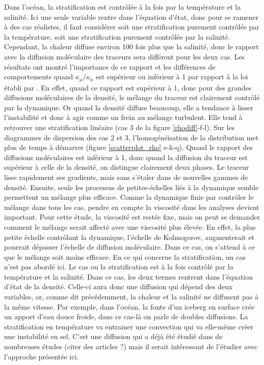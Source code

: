 \documentclass[a4paper,12pt]{article}
\begin{document}
    Dans l'océan, la stratification est contrôlée à la fois par la température et la salinité. Ici une seule variable rentre dans l'équation d'état, donc pour se ramener à des cas réalistes, il faut considérer soit une stratification purement contrôlée par la température, soit une stratification purement contrôlée par la salinité. Cependant, la chaleur diffuse environ 100 fois plus que la salinité, donc le rapport avec la diffusion moléculaire des traceurs sera différent pour les deux cas. Les résultats ont montré l'importance de ce rapport et les différences de comportements quand $\kappa_{\rho}/\kappa_{\phi}$ est supérieur ou inférieur à 1 par rapport à la loi établi par \cite{penney_diapycnal_2020}. En effet, quand ce rapport est supérieur à 1, donc pour des grandes diffusions moléculaires de la densité, le mélange du traceur est clairement contrôlé par la dynamique. Or quand la densité diffuse beaucoup, elle a tendance à lisser l'instabilité et donc à agir comme un frein au mélange turbulent. Elle tend à retrouver une stratification linéaire (cas 3 de la figure \ref{rhodiff}-f-l). Sur les diagrammes de dispersion des cas 2 et 3, l'homogénéisation de la distribution met plus de temps à démarrer (figure \ref{scatterplot_rho} e-k-q). Quand le rapport des diffusions moléculaires est inférieur à 1, donc quand la diffusion du traceur est supérieur à celle de la densité, on distingue clairement deux phases. Le traceur lisse rapidement ses gradients, mais sans s'étaler dans de nouvelles gammes de densité. Ensuite, seule les processus de petites-échelles liés à la dynamique semble permettent un mélange plus efficace. Comme la dynamique finie par contrôler le mélange dans tous les cas, pendre en compte la viscosité dans les analyses devient important. Pour cette étude, la viscosité est restée fixe, mais on peut se demander comment le mélange serait affecté avec une viscosité plus élevée. En effet, la plus petite échelle contrôlant la dynamique, l'échelle de Kolmogorov, augmenterait et pourrait dépasser l'échelle de diffusion moléculaire. Dans ce cas, on s'attend à ce que le mélange soit moins efficace. En ce qui concerne la stratification, un cas n'est pas abordé ici. Le cas ou la stratification est à la fois contrôlé par la température et la salinité. Dans ce cas, les deux termes rentrent dans l'équation d'état de la densité. Celle-ci aura donc une diffusion qui dépend des deux variables, or, comme dit précédemment, la chaleur et la salinité ne diffusent pas à la même vitesse. Par exemple, dans l'océan, la fonte d'un iceberg en surface crée un apport d'eau douce froide, dans ce cas-là on parle de doubles diffusions. La stratification en température va entrainer une convection qui va elle-même créer une instabilité en sel. C'est une diffusion qui a déjà été étudié dans de nombreuses études (citer des articles ?) mais il serait intéressant de l'étudier avec l'approche présentée ici.
\end{document}
